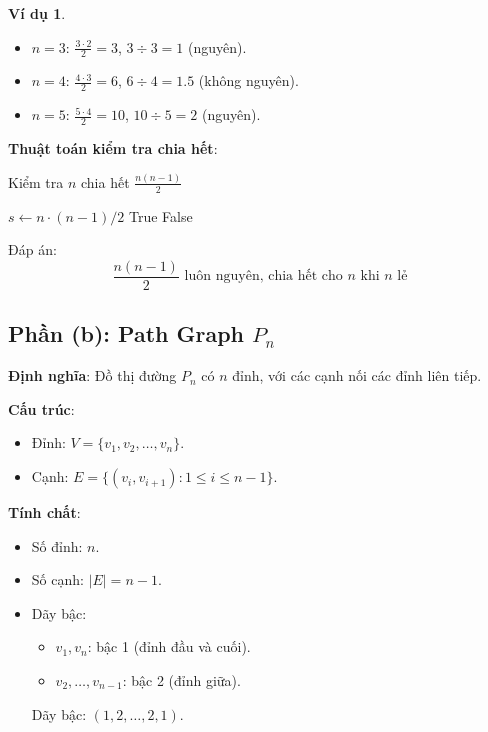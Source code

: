 \documentclass[a4paper,12pt]{article}
\theoremstyle{plain}
\theoremstyle{definition}
\newtheorem{example}{Ví dụ}
\begin{document}
\begin{example}
\begin{itemize}
    \item \( n=3 \): \( \frac{3 \cdot 2}{2} = 3 \), \( 3 \div 3 = 1 \) (nguyên).
    \item \( n=4 \): \( \frac{4 \cdot 3}{2} = 6 \), \( 6 \div 4 = 1.5 \) (không nguyên).
    \item \( n=5 \): \( \frac{5 \cdot 4}{2} = 10 \), \( 10 \div 5 = 2 \) (nguyên).
\end{itemize}
\end{example}

\textbf{Thuật toán kiểm tra chia hết}:
\begin{algorithm}
\caption{Kiểm tra \( n \) chia hết \( \frac{n(n-1)}{2} \)}
\begin{algorithmic}
    \State $s \gets n \cdot (n-1) / 2$
     \Return True
    \Else \Return False
    \EndIf
\EndFunction
\end{algorithmic}
\end{algorithm}

Đáp án:
\[
\boxed{\frac{n(n-1)}{2} \text{ luôn nguyên, chia hết cho } n \text{ khi } n \text{ lẻ}}
\]

\subsection*{Phần (b): Path Graph \( P_n \)}

\textbf{Định nghĩa}: Đồ thị đường \( P_n \) có \( n \) đỉnh, với các cạnh nối các đỉnh liên tiếp.

\textbf{Cấu trúc}:
\begin{itemize}
    \item Đỉnh: \( V = \{v_1, v_2, \ldots, v_n\} \).
    \item Cạnh: \( E = \{(v_i, v_{i+1}) : 1 \leq i \leq n-1\} \).
\end{itemize}

\textbf{Tính chất}:
\begin{itemize}
    \item Số đỉnh: \( n \).
    \item Số cạnh: \( |E| = n-1 \).
    \item Dãy bậc:
    \begin{itemize}
        \item \( v_1, v_n \): bậc 1 (đỉnh đầu và cuối).
        \item \( v_2, \ldots, v_{n-1} \): bậc 2 (đỉnh giữa).
    \end{itemize}
    Dãy bậc: \( (1, 2, \ldots, 2, 1) \).
\end{itemize}
\end{document}
